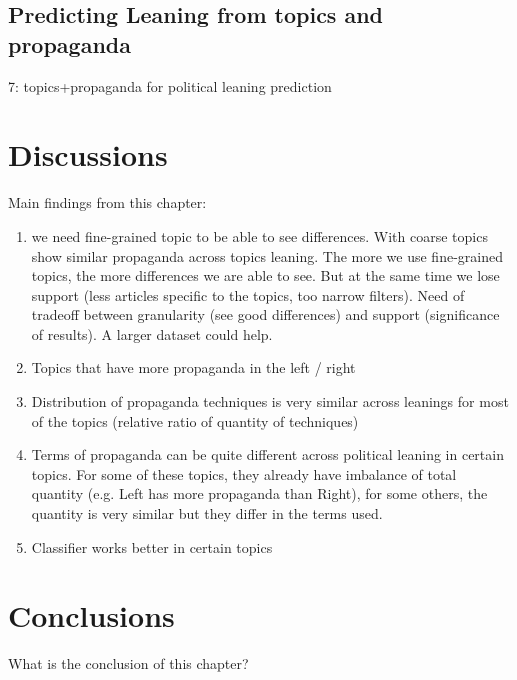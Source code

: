 \subsection{Predicting Leaning from topics and propaganda}
\label{sec:topic_classifier_propaganda_feature}

7: topics+propaganda for political leaning prediction

\section{\statusred Discussions}
\label{sec:topic_discussion}

Main findings from this chapter:

\begin{enumerate}
    \item we need fine-grained topic to be able to see differences. With coarse topics show similar propaganda across topics leaning. The more we use fine-grained topics, the more differences we are able to see. But at the same time we lose support (less articles specific to the topics, too narrow filters). Need of tradeoff between granularity (see good differences) and support (significance of results). A larger dataset could help.
    \item Topics that have more propaganda in the left / right
    \item Distribution of propaganda techniques is very similar across leanings for most of the topics (relative ratio of quantity of techniques)
    \item Terms of propaganda can be quite different across political leaning in certain topics. For some of these topics, they already have imbalance of total quantity (e.g. Left has more propaganda than Right), for some others, the quantity is very similar but they differ in the terms used.
    \item Classifier works better in certain topics
\end{enumerate}


\section{Conclusions}
\label{sec:topic_conclusion}

What is the conclusion of this chapter?